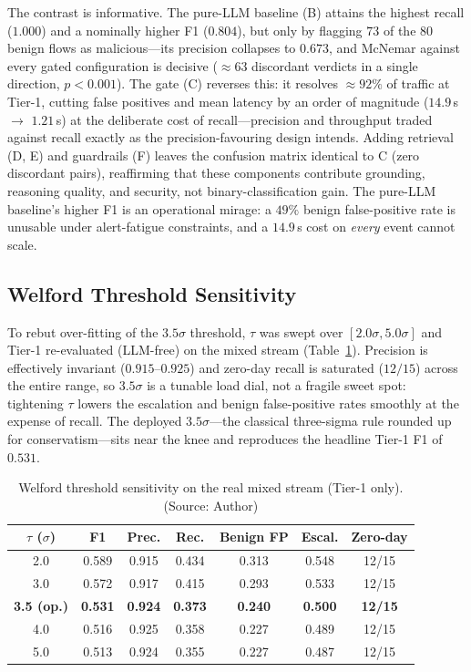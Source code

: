 The contrast is informative. The pure-LLM baseline (B) attains the highest recall ($1.000$) and a nominally higher F1 ($0.804$), but only by flagging $73$ of the $80$ benign flows as malicious---its precision collapses to $0.673$, and McNemar against every gated configuration is decisive ($\approx\!63$ discordant verdicts in a single direction, $p<0.001$). The gate (C) reverses this: it resolves $\approx\!92\%$ of traffic at Tier-1, cutting false positives and mean latency by an order of magnitude ($14.9$\,s $\rightarrow$ $1.21$\,s) at the deliberate cost of recall---precision and throughput traded against recall exactly as the precision-favouring design intends. Adding retrieval (D, E) and guardrails (F) leaves the confusion matrix identical to C (zero discordant pairs), reaffirming that these components contribute grounding, reasoning quality, and security, not binary-classification gain. The pure-LLM baseline's higher F1 is an operational mirage: a $49\%$ benign false-positive rate is unusable under alert-fatigue constraints, and a $14.9$\,s cost on \emph{every} event cannot scale.

\subsection{Welford Threshold Sensitivity}
To rebut over-fitting of the $3.5\sigma$ threshold, $\tau$ was swept over $[2.0\sigma, 5.0\sigma]$ and Tier-1 re-evaluated (LLM-free) on the mixed stream (Table~\ref{tab:sensitivity}). Precision is effectively invariant ($0.915$--$0.925$) and zero-day recall is saturated ($12/15$) across the entire range, so $3.5\sigma$ is a tunable load dial, not a fragile sweet spot: tightening $\tau$ lowers the escalation and benign false-positive rates smoothly at the expense of recall. The deployed $3.5\sigma$---the classical three-sigma rule rounded up for conservatism---sits near the knee and reproduces the headline Tier-1 F1 of $0.531$.

\begin{table}[!htbp]
    \centering \footnotesize \setlength{\tabcolsep}{5pt}
    \caption{Welford threshold sensitivity on the real mixed stream (Tier-1 only). (Source: Author)}
    \label{tab:sensitivity}
    \begin{tabular}{|c|c|c|c|c|c|c|}
        \hline
        \textbf{$\tau$ ($\sigma$)} & \textbf{F1} & \textbf{Prec.} & \textbf{Rec.} & \textbf{Benign FP} & \textbf{Escal.} & \textbf{Zero-day} \\ \hline
        2.0 & 0.589 & 0.915 & 0.434 & 0.313 & 0.548 & 12/15 \\ \hline
        3.0 & 0.572 & 0.917 & 0.415 & 0.293 & 0.533 & 12/15 \\ \hline
        \textbf{3.5 (op.)} & \textbf{0.531} & \textbf{0.924} & \textbf{0.373} & \textbf{0.240} & \textbf{0.500} & \textbf{12/15} \\ \hline
        4.0 & 0.516 & 0.925 & 0.358 & 0.227 & 0.489 & 12/15 \\ \hline
        5.0 & 0.513 & 0.924 & 0.355 & 0.227 & 0.487 & 12/15 \\ \hline
    \end{tabular}
\end{table}

